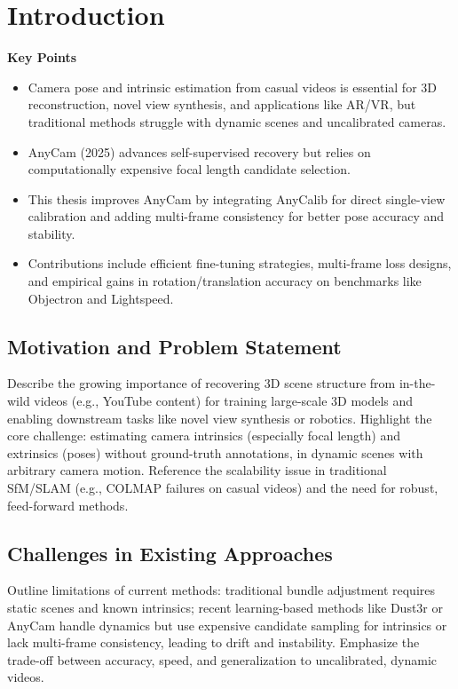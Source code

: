 
\chapter{Introduction}\label{chapter:introduction}

\textbf{Key Points}
\begin{itemize}
  \item Camera pose and intrinsic estimation from casual videos is essential for 3D reconstruction, novel view synthesis, and applications like AR/VR, but traditional methods struggle with dynamic scenes and uncalibrated cameras.
  \item AnyCam (2025) advances self-supervised recovery but relies on computationally expensive focal length candidate selection.
  \item This thesis improves AnyCam by integrating AnyCalib for direct single-view calibration and adding multi-frame consistency for better pose accuracy and stability.
  \item Contributions include efficient fine-tuning strategies, multi-frame loss designs, and empirical gains in rotation/translation accuracy on benchmarks like Objectron and Lightspeed.
\end{itemize}

\section{Motivation and Problem Statement}\label{sec:motivation}
Describe the growing importance of recovering 3D scene structure from in-the-wild videos (e.g., YouTube content) for training large-scale 3D models and enabling downstream tasks like novel view synthesis or robotics. Highlight the core challenge: estimating camera intrinsics (especially focal length) and extrinsics (poses) without ground-truth annotations, in dynamic scenes with arbitrary camera motion. Reference the scalability issue in traditional SfM/SLAM (e.g., COLMAP failures on casual videos) and the need for robust, feed-forward methods.

\section{Challenges in Existing Approaches}\label{sec:challenges}
Outline limitations of current methods: traditional bundle adjustment requires static scenes and known intrinsics; recent learning-based methods like Dust3r or AnyCam handle dynamics but use expensive candidate sampling for intrinsics or lack multi-frame consistency, leading to drift and instability. Emphasize the trade-off between accuracy, speed, and generalization to uncalibrated, dynamic videos.

